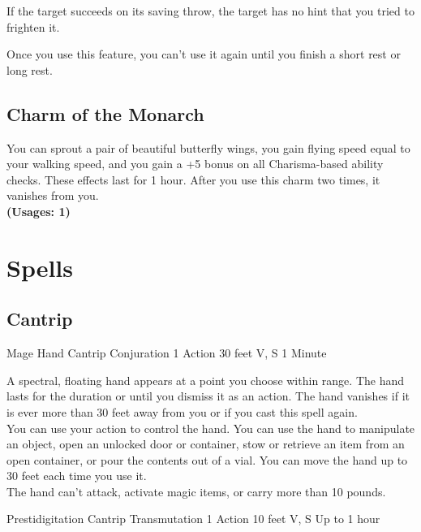 \documentclass[letterpaper,openany,oneside,twocolumn]{book}
\begin{document}
If the target succeeds on its saving throw, the target has no hint that you tried to frighten it.

Once you use this feature, you can't use it again until you finish a short rest or long rest.
\subsection*{Charm of the Monarch}
You can sprout a pair of beautiful butterfly wings, you gain flying speed equal to your walking speed, and you gain a +5 bonus on all Charisma-based ability checks. These effects last for 1 hour. After you use this charm two times, it vanishes from you.\\
\textbf{(Usages: 1)}

\section*{Spells}
\subsection*{Cantrip}

\DndSpellHeader
  {Mage Hand}
  {Cantrip Conjuration}
  {1 Action}
  {30 feet}
  {V, S}
  {1 Minute}
  
A spectral, floating hand appears at a point you choose within range. The hand lasts for the duration or until you dismiss it as an action. The hand vanishes if it is ever more than 30 feet away from you or if you cast this spell again.\\
You can use your action to control the hand. You can use the hand to manipulate an object, open an unlocked door or container, stow or retrieve an item from an open container, or pour the contents out of a vial. You can move the hand up to 30 feet each time you use it.\\
The hand can't attack, activate magic items, or carry more than 10 pounds.

\DndSpellHeader
  {Prestidigitation}
  {Cantrip Transmutation}
  {1 Action}
  {10 feet}
  {V, S}
  {Up to 1 hour}
\end{document}
